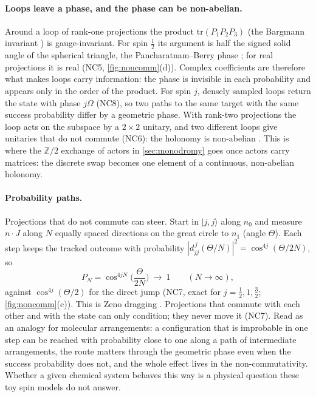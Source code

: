 \documentclass[11pt]{article}
\theoremstyle{definition}\newtheorem{definition}[theorem]{Definition}\newtheorem{remark}[theorem]{Remark}\newtheorem{example}[theorem]{Example}
\begin{document}
\paragraph{Loops leave a phase, and the phase can be non-abelian.}
Around a loop of rank-one projections the product $\mathrm{tr}(P_1P_2P_3)$ (the Bargmann invariant \cite{Bargmann1964}) is gauge-invariant.
For spin $\tfrac12$ its argument is half the signed solid angle of the spherical triangle, the Pancharatnam--Berry phase
\cite{Pancharatnam1956,Berry1984}; for real projections it is real (NC5, \cref{fig:noncomm}(d)). Complex coefficients are therefore
what makes loops carry information: the phase is invisible in each probability and appears only in the order of the product. For
spin $j$, densely sampled loops return the state with phase $j\Omega$ (NC8), so two paths to the same target with the same success
probability differ by a geometric phase. With rank-two projections the loop acts on the subspace by a $2\times2$ unitary, and two
different loops give unitaries that do not commute (NC6): the holonomy is non-abelian \cite{WilczekZee1984}. This is where the
$\mathbb Z/2$ exchange of actors in \cref{sec:monodromy} goes once actors carry matrices: the discrete swap becomes one element of a
continuous, non-abelian holonomy.

\paragraph{Probability paths.}
Projections that do not commute can steer. Start in $|j,j\rangle$ along $n_0$ and measure $n\cdot J$ along $N$ equally spaced directions on
the great circle to $n_1$ (angle $\Theta$). Each step keeps the tracked outcome with probability $|d^{\,j}_{jj}(\Theta/N)|^2=
\cos^{4j}(\Theta/2N)$, so
\[
  P_N=\cos^{4jN}\!\Big(\frac{\Theta}{2N}\Big)\ \longrightarrow\ 1\qquad(N\to\infty),
\]
against $\cos^{4j}(\Theta/2)$ for the direct jump (NC7, exact for $j=\tfrac12,1,\tfrac32$; \cref{fig:noncomm}(c)). This is Zeno dragging
\cite{MisraSudarshan1977,AharonovVardi1980}. Projections that commute with each other and with the state can only condition; they never
move it (NC7). Read as an analogy for molecular arrangements: a configuration that is improbable in one step can be reached with probability
close to one along a path of intermediate arrangements, the route matters through the geometric phase even when the success probability
does not, and the whole effect lives in the non-commutativity. Whether a given chemical system behaves this way is a physical question
these toy spin models do not answer.
\end{document}
